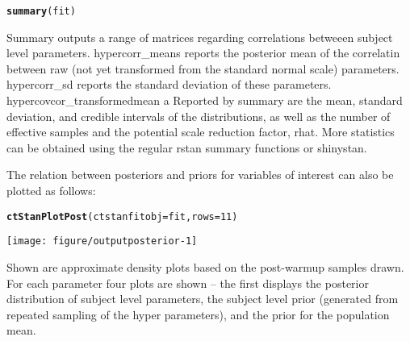 \documentclass[nojss]{jss}\usepackage[]{graphicx}\usepackage[]{color}
\makeatletter
\def\maxwidth{ %
  \ifdim\Gin@nat@width>\linewidth
    \linewidth
  \else
    \Gin@nat@width
  \fi
}
\newcommand{\hlnum}[1]{\textcolor[rgb]{0.686,0.059,0.569}{#1}}%
\newcommand{\hlstd}[1]{\textcolor[rgb]{0.345,0.345,0.345}{#1}}%
\newcommand{\hlkwc}[1]{\textcolor[rgb]{0.333,0.667,0.333}{#1}}%
\newcommand{\hlkwd}[1]{\textcolor[rgb]{0.737,0.353,0.396}{\textbf{#1}}}%
\newenvironment{kframe}{%
 \def\at@end@of@kframe{}%
 \ifinner\ifhmode%
  \def\at@end@of@kframe{\end{minipage}}%
  \begin{minipage}{\columnwidth}%
 \fi\fi%
 \def\FrameCommand##1{\hskip\@totalleftmargin \hskip-\fboxsep
 \colorbox{shadecolor}{##1}\hskip-\fboxsep
     \hskip-\linewidth \hskip-\@totalleftmargin \hskip\columnwidth}%
 \MakeFramed {\advance\hsize-\width
   \@totalleftmargin\z@ \linewidth\hsize
   \@setminipage}}%
 {\par\unskip\endMakeFramed%
 \at@end@of@kframe}
\newenvironment{knitrout}{}{} %
\makeatother
\begin{document}
\begin{knitrout}\small
{}\color{fgcolor}\begin{kframe}
\begin{alltt}
\hlkwd{summary}\hlstd{(fit)}
\end{alltt}
\end{kframe}
\end{knitrout}

Summary outputs a range of matrices regarding correlations betweeen subject level parameters. hypercorr\_means reports the posterior mean of the correlatin between raw (not yet transformed from the standard normal scale) parameters. hypercorr\_sd reports the standard deviation of these parameters. hypercovcor\_transformedmean a Reported by summary are the mean, standard deviation, and credible intervals of the distributions, as well as the number of effective samples and the potential scale reduction factor, rhat. More statistics can be obtained using the regular rstan summary functions or shinystan.

The relation between posteriors and priors for variables of interest can also be plotted as follows:

\begin{knitrout}\small
{}\color{fgcolor}\begin{kframe}
\begin{alltt}
\hlkwd{ctStanPlotPost}\hlstd{(}\hlkwc{ctstanfitobj} \hlstd{= fit,} \hlkwc{rows}\hlstd{=}\hlnum{11}\hlstd{)}
\end{alltt}
\end{kframe}

{\centering \texttt{[image: figure/outputposterior-1]} 

}



\end{knitrout}

Shown are approximate density plots based on the post-warmup samples drawn. For each parameter four plots are shown -- the first displays the posterior distribution of subject level parameters, the subject level prior (generated from repeated sampling of the hyper parameters), and the prior for the population mean.
\end{document}
